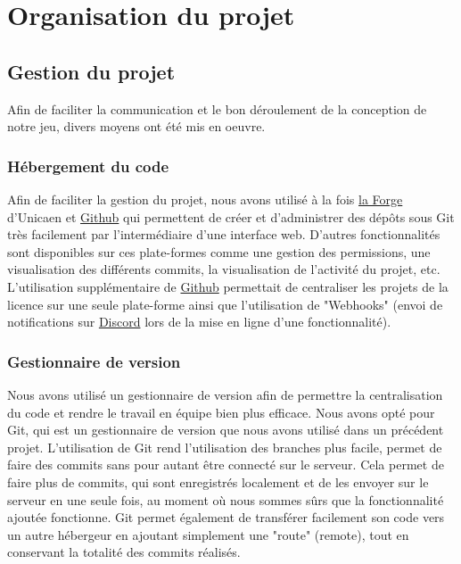 \documentclass[a4paper, 12pt]{article}
\begin{document}
\newpage %

\section{Organisation du projet}

    \subsection{Gestion du projet}

		Afin de faciliter la communication et le bon déroulement de la conception de notre jeu, divers moyens ont été mis en oeuvre.

        \subsubsection{Hébergement du code}
        
            Afin de faciliter la gestion du projet, nous avons utilisé à la fois \href{https://forge.info.unicaen.fr/}{la Forge} d’Unicaen et \href{https://github.com/}{Github} qui permettent de créer et d’administrer des dépôts sous Git très facilement par l’intermédiaire d’une interface web. D’autres fonctionnalités sont disponibles  sur ces plate-formes comme une gestion des permissions, une visualisation des différents commits, la visualisation de l’activité du projet, etc. L'utilisation supplémentaire de \href{https://github.com/}{Github} permettait de centraliser les projets de la licence sur une seule plate-forme ainsi que l'utilisation de "Webhooks" (envoi de notifications sur \href{https://discordapp.com/}{Discord} lors de la mise en ligne d'une fonctionnalité).
            
		\subsubsection{Gestionnaire de version}

			Nous avons utilisé un gestionnaire de version afin de permettre la centralisation du code et rendre le travail en équipe bien plus efficace. Nous avons opté pour Git, qui est un gestionnaire de version que nous avons utilisé dans un précédent projet. L'utilisation de Git rend l'utilisation des branches plus facile, permet de faire des commits sans pour autant être connecté sur le serveur. Cela permet de faire plus de commits, qui sont enregistrés localement et de les envoyer sur le serveur en une seule fois, au moment où nous sommes sûrs que la fonctionnalité ajoutée fonctionne. Git permet également de transférer facilement son code vers un autre hébergeur en ajoutant simplement une "route" (remote), tout en conservant la totalité des commits réalisés.
\end{document}
